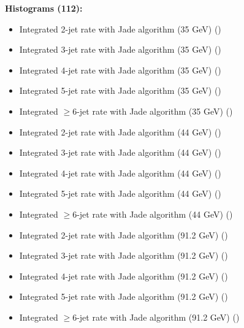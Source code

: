 \vspace{1em}
\noindent
\textbf{Histograms (112):}
\begin{itemize}
  \item Integrated 2-jet rate with Jade algorithm (35 GeV) ({\smaller {}})
  \item Integrated 3-jet rate with Jade algorithm (35 GeV) ({\smaller {}})
  \item Integrated 4-jet rate with Jade algorithm (35 GeV) ({\smaller {}})
  \item Integrated 5-jet rate with Jade algorithm (35 GeV) ({\smaller {}})
  \item Integrated $\geq$6-jet rate with Jade algorithm (35 GeV) ({\smaller {}})
  \item Integrated 2-jet rate with Jade algorithm (44 GeV) ({\smaller {}})
  \item Integrated 3-jet rate with Jade algorithm (44 GeV) ({\smaller {}})
  \item Integrated 4-jet rate with Jade algorithm (44 GeV) ({\smaller {}})
  \item Integrated 5-jet rate with Jade algorithm (44 GeV) ({\smaller {}})
  \item Integrated $\geq$6-jet rate with Jade algorithm (44 GeV) ({\smaller {}})
  \item Integrated 2-jet rate with Jade algorithm (91.2 GeV) ({\smaller {}})
  \item Integrated 3-jet rate with Jade algorithm (91.2 GeV) ({\smaller {}})
  \item Integrated 4-jet rate with Jade algorithm (91.2 GeV) ({\smaller {}})
  \item Integrated 5-jet rate with Jade algorithm (91.2 GeV) ({\smaller {}})
  \item Integrated $\geq$6-jet rate with Jade algorithm (91.2 GeV) ({\smaller {}})

\end{itemize}
